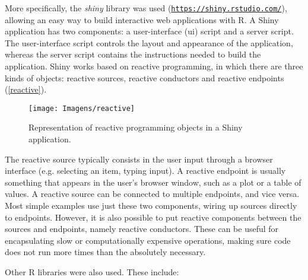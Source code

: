 More specifically, the \textit{shiny} library was used (\href{https://shiny.rstudio.com/}{\nolinkurl{https://shiny.rstudio.com/}}), allowing an easy way to build interactive web applications with R. A Shiny application has two components: a user-interface (ui) script and a server script. The user-interface script controls the layout and appearance of the application, whereas the server script contains the instructions needed to build the application. Shiny works based on reactive programming, in which there are three kinds of objects: reactive sources, reactive conductors and reactive endpoints (\autoref{reactive}).

\begin{figure}[h]
	\centering
	\texttt{[image: Imagens/reactive]}
	\caption{Representation of reactive programming objects in a Shiny application.}
	\label{reactive}
\end{figure}

The reactive source typically consists in the user input through a browser interface (e.g. selecting an item, typing input). A reactive endpoint is usually something that appears in the user's browser window, such as a plot or a table of values. A reactive source can be connected to multiple endpoints, and vice versa. Most simple examples use just these two components, wiring up sources directly to endpoints. However, it is also possible to put reactive components between the sources and endpoints, namely reactive conductors. These can be useful for encapsulating slow or computationally expensive operations, making sure code does not run more times than the absolutely necessary.

Other R libraries were also used. These include:

